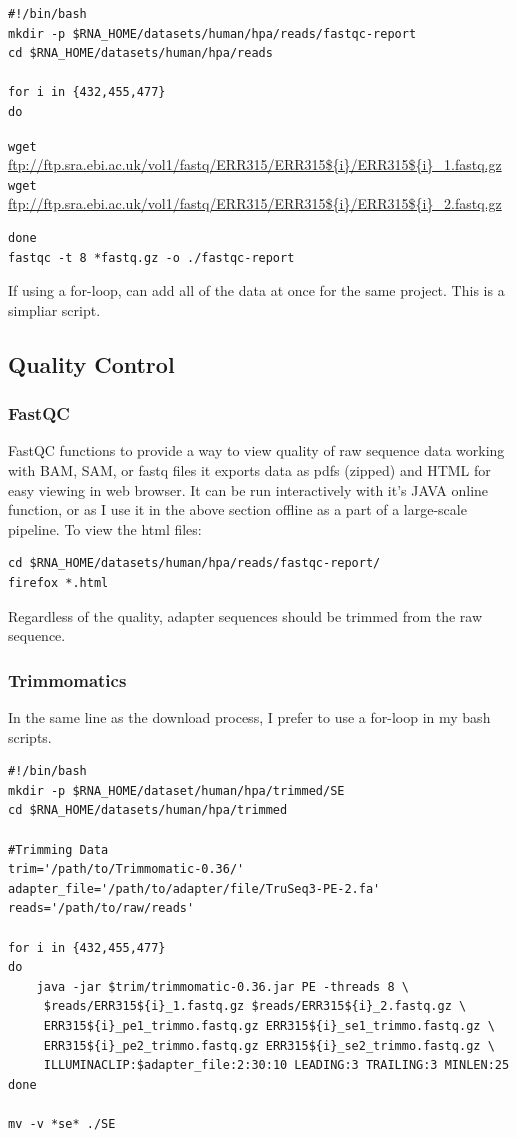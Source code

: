 \begin{verbatim}
#!/bin/bash
mkdir -p $RNA_HOME/datasets/human/hpa/reads/fastqc-report
cd $RNA_HOME/datasets/human/hpa/reads

for i in {432,455,477}
do
\end{verbatim}

\noindent\texttt{wget} \url{ftp://ftp.sra.ebi.ac.uk/vol1/fastq/ERR315/ERR315${i}/ERR315${i}_1.fastq.gz}\\
\texttt{wget} \url{ftp://ftp.sra.ebi.ac.uk/vol1/fastq/ERR315/ERR315${i}/ERR315${i}_2.fastq.gz}\\
\begin{verbatim}
done
fastqc -t 8 *fastq.gz -o ./fastqc-report
\end{verbatim}

If using a for-loop, can add all of the data at once for the same project. This is a simpliar script.

\subsection{Quality Control}
\subsubsection*{FastQC}
FastQC functions to provide a way to view quality of raw sequence data working with BAM, SAM, or fastq files it exports data as pdfs (zipped) and HTML for easy viewing in web browser. It can be run interactively with it's JAVA online function, or as I use it in the above section offline as a part of a large-scale pipeline. To view the html files:

\begin{verbatim}
cd $RNA_HOME/datasets/human/hpa/reads/fastqc-report/
firefox *.html
\end{verbatim}

Regardless of the quality, adapter sequences should be trimmed from the raw sequence.

\subsubsection*{Trimmomatics}
In the same line as the download process, I prefer to use a for-loop in my bash scripts.

\begin{verbatim}
#!/bin/bash
mkdir -p $RNA_HOME/dataset/human/hpa/trimmed/SE
cd $RNA_HOME/datasets/human/hpa/trimmed

#Trimming Data
trim='/path/to/Trimmomatic-0.36/'
adapter_file='/path/to/adapter/file/TruSeq3-PE-2.fa'
reads='/path/to/raw/reads'

for i in {432,455,477}
do
    java -jar $trim/trimmomatic-0.36.jar PE -threads 8 \
	 $reads/ERR315${i}_1.fastq.gz $reads/ERR315${i}_2.fastq.gz \
	 ERR315${i}_pe1_trimmo.fastq.gz ERR315${i}_se1_trimmo.fastq.gz \
	 ERR315${i}_pe2_trimmo.fastq.gz ERR315${i}_se2_trimmo.fastq.gz \
	 ILLUMINACLIP:$adapter_file:2:30:10 LEADING:3 TRAILING:3 MINLEN:25
done

mv -v *se* ./SE
\end{verbatim}

